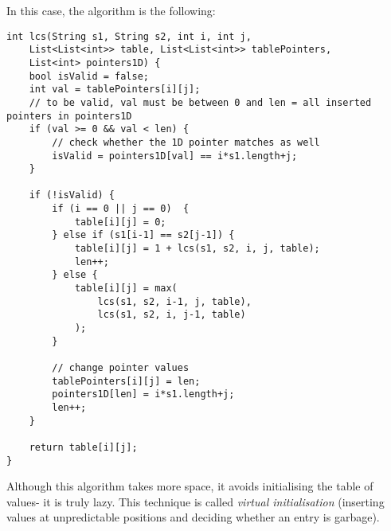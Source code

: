 \documentclass[a4paper, openany]{memoir}
\begin{document}
    In this case, the algorithm is the following:
\begin{lstlisting}[language=pseudocode]
int lcs(String s1, String s2, int i, int j,
    List<List<int>> table, List<List<int>> tablePointers, 
    List<int> pointers1D) {
    bool isValid = false;
    int val = tablePointers[i][j];
    // to be valid, val must be between 0 and len = all inserted pointers in pointers1D
    if (val >= 0 && val < len) {
        // check whether the 1D pointer matches as well
        isValid = pointers1D[val] == i*s1.length+j;
    }

    if (!isValid) {
        if (i == 0 || j == 0)  {
            table[i][j] = 0;
        } else if (s1[i-1] == s2[j-1]) {
            table[i][j] = 1 + lcs(s1, s2, i, j, table);
            len++;
        } else {
            table[i][j] = max(
                lcs(s1, s2, i-1, j, table), 
                lcs(s1, s2, i, j-1, table)
            );
        }

        // change pointer values
        tablePointers[i][j] = len;
        pointers1D[len] = i*s1.length+j;
        len++;
    }

    return table[i][j];
}
\end{lstlisting}
    Although this algorithm takes more space, it avoids initialising the table of values- it is truly lazy. This technique is called \emph{virtual initialisation} (inserting values at unpredictable positions and deciding whether an entry is garbage).
    
\end{document}
